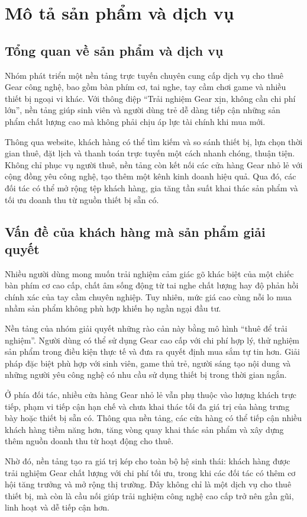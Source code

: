\section{Mô tả sản phẩm và dịch vụ}

\subsection{Tổng quan về sản phẩm và dịch vụ}
    Nhóm phát triển một nền tảng trực tuyến chuyên cung cấp dịch vụ cho thuê Gear công nghệ, bao gồm bàn phím cơ, tai nghe, tay cầm chơi game và nhiều thiết bị ngoại vi khác. Với thông điệp ``Trải nghiệm Gear xịn, không cần chi phí lớn'', nền tảng giúp sinh viên và người dùng trẻ dễ dàng tiếp cận những sản phẩm chất lượng cao mà không phải chịu áp lực tài chính khi mua mới.

    Thông qua website, khách hàng có thể tìm kiếm và so sánh thiết bị, lựa chọn thời gian thuê, đặt lịch và thanh toán trực tuyến một cách nhanh chóng, thuận tiện. Không chỉ phục vụ người thuê, nền tảng còn kết nối các cửa hàng Gear nhỏ lẻ với cộng đồng yêu công nghệ, tạo thêm một kênh kinh doanh hiệu quả. Qua đó, các đối tác có thể mở rộng tệp khách hàng, gia tăng tần suất khai thác sản phẩm và tối ưu doanh thu từ nguồn thiết bị sẵn có.

\subsection{Vấn đề của khách hàng mà sản phẩm giải quyết}
    Nhiều người dùng mong muốn trải nghiệm cảm giác gõ khác biệt của một chiếc bàn phím cơ cao cấp, chất âm sống động từ tai nghe chất lượng hay độ phản hồi chính xác của tay cầm chuyên nghiệp. Tuy nhiên, mức giá cao cùng nỗi lo mua nhầm sản phẩm không phù hợp khiến họ ngần ngại đầu tư.

    Nền tảng của nhóm giải quyết những rào cản này bằng mô hình ``thuê để trải nghiệm''. Người dùng có thể sử dụng Gear cao cấp với chi phí hợp lý, thử nghiệm sản phẩm trong điều kiện thực tế và đưa ra quyết định mua sắm tự tin hơn. Giải pháp đặc biệt phù hợp với sinh viên, game thủ trẻ, người sáng tạo nội dung và những người yêu công nghệ có nhu cầu sử dụng thiết bị trong thời gian ngắn.

    Ở phía đối tác, nhiều cửa hàng Gear nhỏ lẻ vẫn phụ thuộc vào lượng khách trực tiếp, phạm vi tiếp cận hạn chế và chưa khai thác tối đa giá trị của hàng trưng bày hoặc thiết bị sẵn có. Thông qua nền tảng, các cửa hàng có thể tiếp cận nhiều khách hàng tiềm năng hơn, tăng vòng quay khai thác sản phẩm và xây dựng thêm nguồn doanh thu từ hoạt động cho thuê.

    Nhờ đó, nền tảng tạo ra giá trị kép cho toàn bộ hệ sinh thái: khách hàng được trải nghiệm Gear chất lượng với chi phí tối ưu, trong khi các đối tác có thêm cơ hội tăng trưởng và mở rộng thị trường. Đây không chỉ là một dịch vụ cho thuê thiết bị, mà còn là cầu nối giúp trải nghiệm công nghệ cao cấp trở nên gần gũi, linh hoạt và dễ tiếp cận hơn.